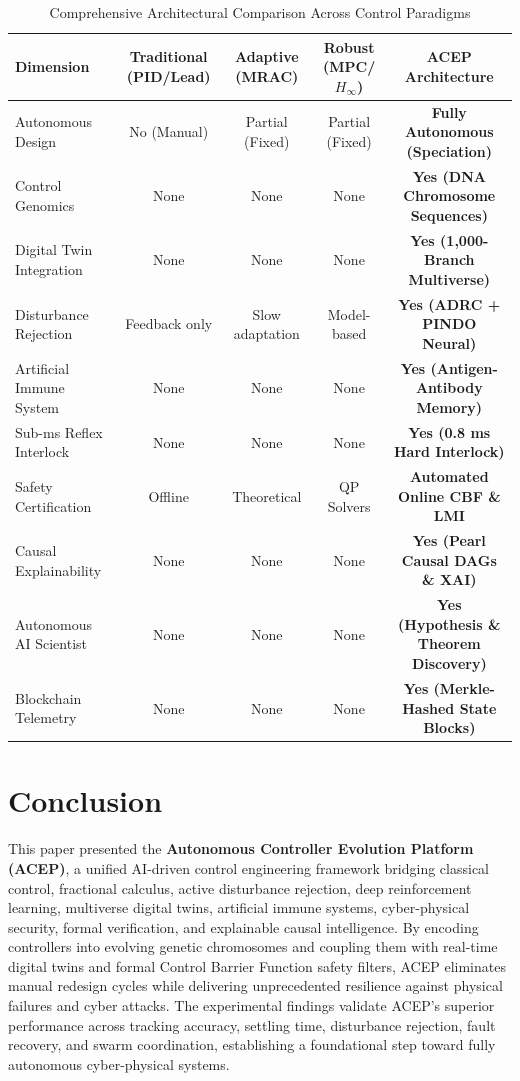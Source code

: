 \documentclass[journal,twocolumn]{IEEEtran}
\begin{document}
\begin{table}[t]
\caption{Comprehensive Architectural Comparison Across Control Paradigms}
\label{tab:comparison}
\centering
\begin{tabular}{lcccc}
\toprule
\textbf{Dimension} & \textbf{Traditional (PID/Lead)} & \textbf{Adaptive (MRAC)} & \textbf{Robust (MPC/$H_\infty$)} & \textbf{ACEP Architecture} \\
\midrule
Autonomous Design & No (Manual) & Partial (Fixed) & Partial (Fixed) & \textbf{Fully Autonomous (Speciation)} \\
Control Genomics & None & None & None & \textbf{Yes (DNA Chromosome Sequences)} \\
Digital Twin Integration & None & None & None & \textbf{Yes (1,000-Branch Multiverse)} \\
Disturbance Rejection & Feedback only & Slow adaptation & Model-based & \textbf{Yes (ADRC + PINDO Neural)} \\
Artificial Immune System & None & None & None & \textbf{Yes (Antigen-Antibody Memory)} \\
Sub-ms Reflex Interlock & None & None & None & \textbf{Yes (0.8 ms Hard Interlock)} \\
Safety Certification & Offline & Theoretical & QP Solvers & \textbf{Automated Online CBF \& LMI} \\
Causal Explainability & None & None & None & \textbf{Yes (Pearl Causal DAGs \& XAI)} \\
Autonomous AI Scientist & None & None & None & \textbf{Yes (Hypothesis \& Theorem Discovery)} \\
Blockchain Telemetry & None & None & None & \textbf{Yes (Merkle-Hashed State Blocks)} \\
\bottomrule
\end{tabular}
\end{table}

\section{Conclusion}
This paper presented the \textbf{Autonomous Controller Evolution Platform (ACEP)}, a unified AI-driven control engineering framework bridging classical control, fractional calculus, active disturbance rejection, deep reinforcement learning, multiverse digital twins, artificial immune systems, cyber-physical security, formal verification, and explainable causal intelligence. By encoding controllers into evolving genetic chromosomes and coupling them with real-time digital twins and formal Control Barrier Function safety filters, ACEP eliminates manual redesign cycles while delivering unprecedented resilience against physical failures and cyber attacks. The experimental findings validate ACEP's superior performance across tracking accuracy, settling time, disturbance rejection, fault recovery, and swarm coordination, establishing a foundational step toward fully autonomous cyber-physical systems.
\end{document}
